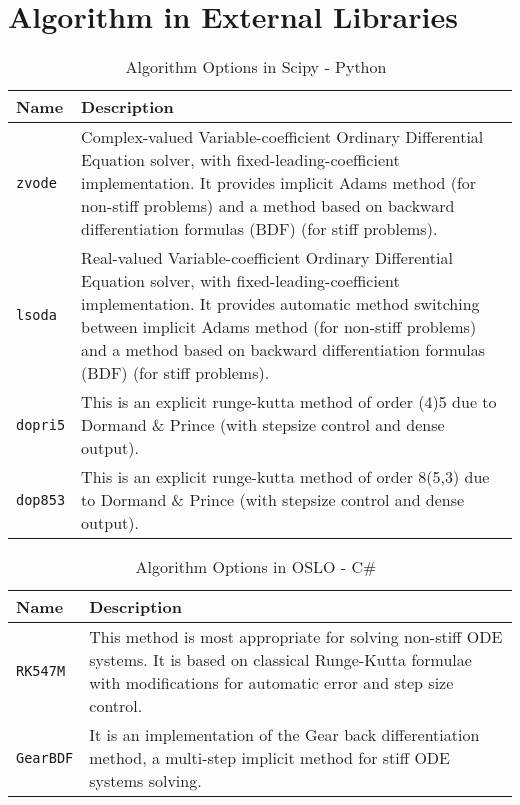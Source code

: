 	


\section{Algorithm in External Libraries}
\label{alg_externallib}

\begin{table}[ht]
\begin{tabular}{ p{} p{} }
	\textbf{Name} & \textbf{Description} \\
	\toprule
	\verb|zvode| & Complex-valued Variable-coefficient Ordinary Differential Equation solver, with fixed-leading-coefficient implementation. It provides implicit Adams method (for non-stiff problems) and a method based on backward differentiation formulas (BDF) (for stiff problems).\\ \hline
	\verb|lsoda| & Real-valued Variable-coefficient Ordinary Differential Equation solver, with fixed-leading-coefficient implementation. It provides automatic method switching between implicit Adams method (for non-stiff problems) and a method based on backward differentiation formulas (BDF) (for stiff problems).\\ \hline
	\verb|dopri5| & This is an explicit runge-kutta method of order (4)5 due to Dormand \& Prince (with stepsize control and dense output).\\ \hline
	\verb|dop853| & This is an explicit runge-kutta method of order 8(5,3) due to Dormand \& Prince (with stepsize control and dense output).\\
	\bottomrule	
\end{tabular}	
\caption{Algorithm Options in Scipy - Python~\citep{scipyfun}}	
\label{tab_algscipy}
\end{table}

\begin{table}[ht]
\begin{tabular}{ p{} p{} }
	\textbf{Name} & \textbf{Description} \\
	\toprule
	\verb|RK547M| & This method is most appropriate for solving non-stiff ODE systems. It is based on classical Runge-Kutta formulae with modifications for automatic error and step size control.\\ \hline
	\verb|GearBDF| & It is an implementation of the Gear back differentiation method, a multi-step implicit method for stiff ODE systems solving.\\
	\bottomrule	
\end{tabular}	
\caption{Algorithm Options in OSLO - C\#~\citep{oslofun}}	
\label{tab_algodeint}
\end{table}

